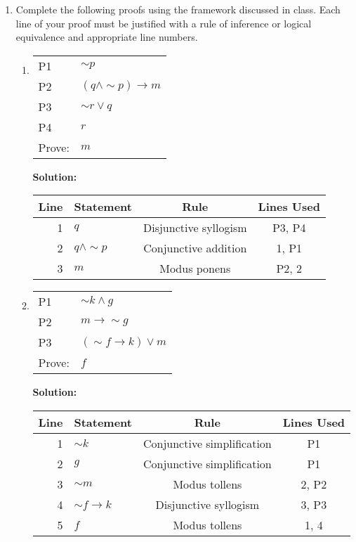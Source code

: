 \documentclass[12pt, letterpaper]{report}
\newcommand{\nott}{{\sim}}
\newcommand{\sol}{\textbf{Solution: }}
\begin{document}
\begin{enumerate}
\begin{enumerate}
		\sol Dilemma (or proof by division into cases).
	\end{enumerate}


	\item Complete the following proofs using the framework discussed in class.  Each line
	of your proof must be justified with a rule of inference or logical equivalence and appropriate line numbers.
	
	\begin{enumerate}
		\item
			\begin{tabular}[t]{ll}
			P1 & $\nott p$ \\ 
			P2 & $(q \land \nott p) \to m$ \\
			P3 & $\nott r \lor q$ \\ 
			P4 & $r$ \\ \hline
			Prove: & $m$
		\end{tabular}
		
		\sol
		
		\begin{tabular}{|r|l|c|c|} \hline
                Line & Statement & Rule & Lines Used \\ \hline
                1 & $q$ & Disjunctive syllogism & P3, P4 \\ \hline
                2 & $q \land \nott p$ & Conjunctive addition & 1, P1 \\ \hline
                3 & $m$ & Modus ponens & P2, 2 \\ \hline
                \end{tabular}
		
		\item
			\begin{tabular}[t]{ll}
			P1 & $\nott k \land g$ \\ 
			P2 & $m \to \nott g$ \\
			P3 & $(\nott f \to k) \lor m$ \\ \hline
			Prove: & $f$
		\end{tabular}
		
		\sol
		
\begin{tabular}{|r|l|c|c|} \hline
                Line & Statement & Rule & Lines Used \\ \hline
                1 & $\nott k$ & Conjunctive simplification & P1 \\ \hline
                2 & $g$ & Conjunctive simplification & P1 \\ \hline
                3 & $\nott m$ & Modus tollens & 2, P2 \\ \hline
                4 & $\nott f \to k$ & Disjunctive syllogism & 3, P3 \\ \hline
                5 & $f$ & Modus tollens & 1, 4 \\ \hline
        \end{tabular}
		
	\end{enumerate}

\end{enumerate}
\end{document}
